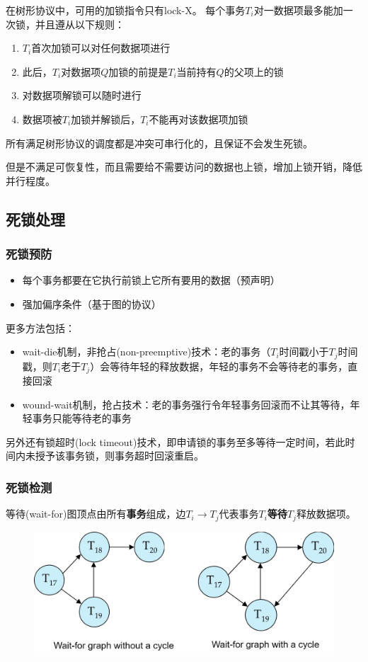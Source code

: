 在树形协议中，可用的加锁指令只有lock-X。
每个事务$T_i$对一数据项最多能加一次锁，并且遵从以下规则：
\begin{enumerate}
	\item $T_i$首次加锁可以对任何数据项进行
	\item 此后，$T_i$对数据项$Q$加锁的前提是$T_i$当前持有$Q$的父项上的锁
	\item 对数据项解锁可以随时进行
	\item 数据项被$T_i$加锁并解锁后，$T_i$不能再对该数据项加锁
\end{enumerate}
所有满足树形协议的调度都是冲突可串行化的，且保证不会发生死锁。

但是不满足可恢复性，而且需要给不需要访问的数据也上锁，增加上锁开销，降低并行程度。

\subsection{死锁处理}
\subsubsection{死锁预防}
\begin{itemize}
	\item 每个事务都要在它执行前锁上它所有要用的数据（预声明）
	\item 强加偏序条件（基于图的协议）
\end{itemize}

更多方法包括：
\begin{itemize}
	\item wait-die机制，非抢占(non-preemptive)技术：老的事务（$T_i$时间戳小于$T_j$时间戳，则$T_i$老于$T_j$）会等待年轻的释放数据，年轻的事务不会等待老的事务，直接回滚
	\item wound-wait机制，抢占技术：老的事务强行令年轻事务回滚而不让其等待，年轻事务只能等待老的事务
\end{itemize}

另外还有锁超时(lock timeout)技术，即申请锁的事务至多等待一定时间，若此时间内未授予该事务锁，则事务超时回滚重启。

\subsubsection{死锁检测}
等待(wait-for)图顶点由所有\textbf{事务}组成，边$T_i\to T_j$代表事务$T_i$\textbf{等待}$T_j$释放数据项。
\begin{figure}[H]
\centering
\includegraphics[width=0.8\linewidth]{fig/wait-for_graph.png}
\end{figure}

